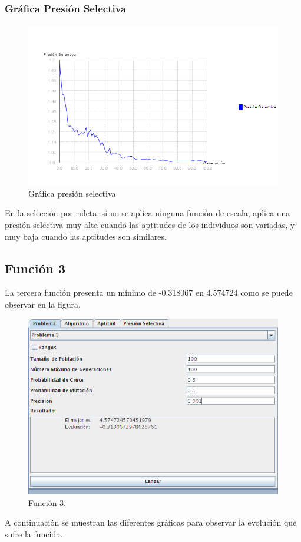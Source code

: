 \documentclass[12pt]{article}
\begin{document}
\subsubsection*{Gráfica Presión Selectiva}
\begin{figure}[H]
\centering
\includegraphics[scale=0.4]{graficas/F2inicial_presion}
\caption{Gráfica presión selectiva}
\label{fig}
\end{figure}
	En la selección por ruleta, si no se aplica ninguna función de escala, aplica una presión selectiva muy alta cuando las aptitudes de los individuos son variadas, y muy baja cuando las aptitudes son similares.
\newpage

\subsection{Función 3}
	La tercera función presenta un mínimo de -0.318067 en 4.574724 como se puede observar en la figura.
\begin{figure}[H]
\centering
\includegraphics[scale=0.4]{graficas/F3inicial}
\caption{Función 3.}
\label{fig}
\end{figure}
	A continuación se muestran las diferentes gráficas para observar la evolución que sufre la función.
\end{document}
